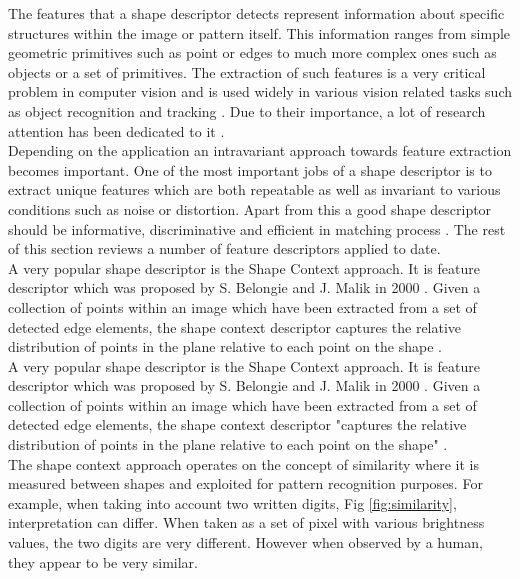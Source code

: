 The features that a shape descriptor detects represent information about specific structures within the image or pattern itself. This information ranges from simple geometric primitives such as point or edges to much more complex ones such as objects or a set of primitives. The extraction of such features is a very critical problem in computer vision and is used widely in various vision related tasks such as object recognition and tracking \cite{Maji_comparison}. Due to their importance, a lot of research attention has been dedicated to it \cite{Heider, Maji_comparison}. \\

Depending on the application an intravariant approach towards feature extraction becomes important. One of the most important jobs of a shape descriptor is to extract unique features which are both repeatable as well as invariant to various conditions such as noise or distortion. Apart from this a good shape descriptor should be informative, discriminative and efficient in matching process \cite{wang}. The rest of this section reviews a number of feature descriptors applied to date. \\

A very popular shape descriptor is the Shape Context approach. It is feature descriptor which was proposed by S. Belongie and J. Malik in 2000 \cite{context}. Given a collection of points within an image which have been extracted from a set of detected edge elements, the shape context descriptor captures the relative distribution of points in the plane relative to each point on the shape \cite{contextWeb}. \\

A very popular shape descriptor is the Shape Context approach. It is feature descriptor which was proposed by S. Belongie and J. Malik in 2000 \cite{context}. Given a collection of points within an image which have been extracted from a set of detected edge elements, the shape context descriptor "captures the relative distribution of points in the plane relative to each point on the shape" \cite{contextWeb}. \\

The shape context approach operates on the concept of similarity where it is measured between shapes and exploited for pattern recognition purposes. For example, when taking into account two written digits, Fig \ref{fig:similarity}, interpretation can differ. When taken as a set of pixel with various brightness values, the two digits are very different. However when observed by a human, they appear to be very similar.


